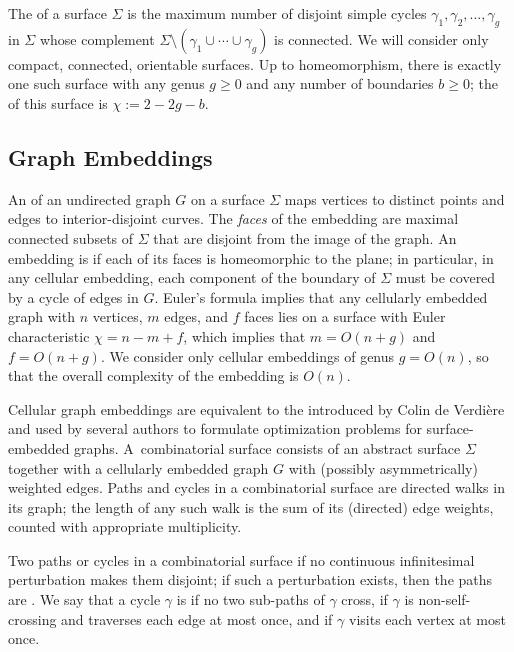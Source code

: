 \documentclass[twoside,leqno,twocolumn]{article}
\begin{document}
The  of a surface $\Sigma$ is the maximum number of disjoint simple cycles $\gamma_1, \gamma_2, \dots, \gamma_g$ in $\Sigma$ whose complement $\Sigma\setminus(\gamma_1\cup\cdots\cup\gamma_g)$ is connected.  We will consider only compact, connected, orientable surfaces.  Up to homeomorphism, there is exactly one such surface with any genus $g\ge 0$ and any number of boundaries $b\ge 0$; the  of this surface is $\chi := 2-2g-b$.

\subsection{Graph Embeddings}

An  of an undirected graph $G$ on a surface $\Sigma$ maps vertices to distinct points and edges to interior-disjoint curves.  The \emph{faces} of the embedding are maximal connected subsets of $\Sigma$ that are disjoint from the image of the graph.  An embedding is  if each of its faces is homeomorphic to the plane; in particular, in any cellular embedding, each component of the boundary of $\Sigma$ must be covered by a cycle of edges in $G$.  Euler's formula implies that any cellularly embedded graph with $n$ vertices, $m$ edges, and $f$ faces lies on a surface with Euler characteristic $\chi = n-m+f$, which implies that $m = O(n+g)$ and $f=O(n+g)$.  We consider only cellular embeddings of genus $g=O(n)$, so that the overall complexity of the embedding is $O(n)$.

Cellular graph embeddings are equivalent to the  introduced by Colin de Verdi\`ere~\cite{c-rcds-03} and used by several authors to formulate optimization problems for surface-embedded graphs.  A~combinatorial surface consists of an abstract surface $\Sigma$ together with a cellularly embedded graph $G$ with (possibly asymmetrically) weighted edges.  Paths and cycles in a combinatorial surface are directed walks in its graph; the length of any such walk is the sum of its (directed) edge weights, counted with appropriate multiplicity.

Two paths or cycles in a combinatorial surface  if no continuous infinitesimal perturbation makes them disjoint; if such a perturbation exists, then the paths are .  We say that a cycle $\gamma$ is  if no two sub-paths of $\gamma$ cross,  if $\gamma$ is non-self-crossing and traverses each edge at most once, and  if $\gamma$ visits each vertex at most once.
\end{document}
